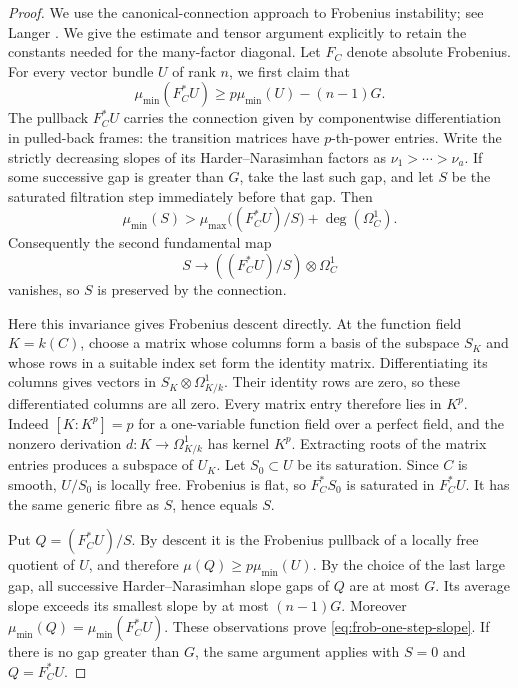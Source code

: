 \begin{proof}
We use the canonical-connection approach to Frobenius instability;
see Langer \cite[\S2, Corollaries~2.4 and~6.2]{Langer2004}.
We give the estimate and tensor argument explicitly to retain the
constants needed for the many-factor diagonal.
Let $F_C$ denote absolute Frobenius.  For every vector bundle $U$ of rank
$n$, we first claim that
\begin{equation}\label{eq:frob-one-step-slope}
 \mu_{\min}(F_C^*U)
 \ge p\mu_{\min}(U)-(n-1)G.
\end{equation}
The pullback $F_C^*U$ carries the connection given by componentwise
differentiation in pulled-back frames: the transition matrices have
$p$-th-power entries.  Write the strictly decreasing slopes of its
Harder--Narasimhan factors as $\nu_1>\cdots>\nu_a$.  If some successive gap
is greater than $G$, take the last such gap, and let $S$ be the saturated
filtration step immediately before that gap.  Then
\[
 \mu_{\min}(S)>
 \mu_{\max}\bigl((F_C^*U)/S\bigr)+\deg(\Omega_C^1).
\]
Consequently the second fundamental map
\[
 S\longrightarrow ((F_C^*U)/S)\otimes\Omega_C^1
\]
vanishes, so $S$ is preserved by the connection.

Here this invariance gives Frobenius descent directly.  At the function
field $K=k(C)$, choose a matrix whose columns form
a basis of the subspace $S_K$ and whose rows in a suitable index set form
the identity matrix.  Differentiating its columns gives vectors in
$S_K\otimes\Omega^1_{K/k}$.  Their identity rows are zero, so these
differentiated columns are all zero.  Every matrix entry therefore lies
in $K^p$.  Indeed $[K:K^p]=p$ for a one-variable function field over a
perfect field, and the nonzero derivation $d:K\to\Omega^1_{K/k}$ has
kernel $K^p$.  Extracting roots of the matrix entries produces a subspace
of $U_K$.  Let $S_0\subset U$ be its saturation.  Since $C$ is smooth,
$U/S_0$ is locally free.  Frobenius is flat, so $F_C^*S_0$ is saturated
in $F_C^*U$.  It has the same generic fibre as $S$, hence equals $S$.

Put $Q=(F_C^*U)/S$.  By descent it is the Frobenius pullback of a locally
free quotient of $U$, and therefore
$\mu(Q)\ge p\mu_{\min}(U)$.  By the choice of the last large gap, all
successive Harder--Narasimhan slope gaps of $Q$ are at most $G$.  Its
average slope exceeds its smallest slope by at most $(n-1)G$.
Moreover $\mu_{\min}(Q)=\mu_{\min}(F_C^*U)$.  These observations prove
\eqref{eq:frob-one-step-slope}.  If there is no gap greater than $G$, the
same argument applies with $S=0$ and $Q=F_C^*U$.


\end{proof}

